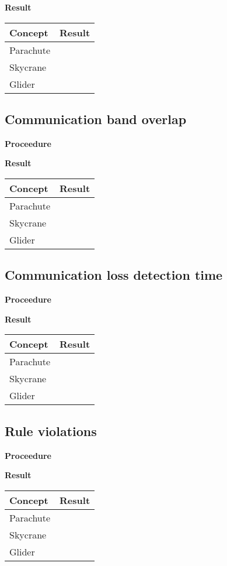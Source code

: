 \documentclass[]{auvsi_doc}
\begin{document}
	\textbf{Result}

	\begin{tabular}{|l|l|}
		\hline
		\textbf{Concept}       & \textbf{Result} \\
		\hline
		Parachute              &                 \\
		Skycrane               &                 \\
		Glider                 &				 \\
		\hline
	\end{tabular}

	\subsection{Communication band overlap}
	\textbf{Proceedure}

	\textbf{Result}

	\begin{tabular}{|l|l|}
		\hline
		\textbf{Concept}       & \textbf{Result} \\
		\hline
		Parachute              &                 \\
		Skycrane               &                 \\
		Glider                 &				 \\
		\hline
	\end{tabular}

	\subsection{Communication loss detection time}
	\textbf{Proceedure}

	\textbf{Result}


	\begin{tabular}{|l|l|}
		\hline
		\textbf{Concept}       & \textbf{Result} \\
		\hline
		Parachute              &                 \\
		Skycrane               &                 \\
		Glider                 &				 \\
		\hline
	\end{tabular}
	\subsection{Rule violations}
	\textbf{Proceedure}

	\textbf{Result}

	\begin{tabular}{|l|l|}
		\hline
		\textbf{Concept}       & \textbf{Result} \\
		\hline
		Parachute              &                 \\
		Skycrane               &                 \\
		Glider                 &				 \\
		\hline
	\end{tabular}
\end{document}
